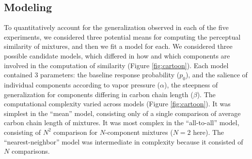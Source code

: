 \subsection*{Modeling}
\label{sec:results_modeling}
To quantitatively account for the generalization observed in each of the five experiments, we considered three potential means for computing the perceptual similarity of mixtures, and then we fit a model for each.  
We considered three possible candidate models, which differed in how and which components are involved in the computation of similarity (Figure \ref{fig:cartoon}).  
Each model contained 3 parameters: the baseline response probability ($p_0$), and the salience of individual components according to vapor pressure ($\alpha$), the steepness of generalization for components differing in carbon chain length ($\beta$).  
The computational complexity varied across models (Figure \ref{fig:cartoon}).  It was simplest in the ``mean'' model, consisting only of a single comparison of average carbon chain length of mixtures.  
It was most complex in the ``all-to-all'' model, consisting of $N^2$ comparison for $N$-component mixtures ($N=2$ here).  The ``nearest-neighbor'' model was intermediate in complexity because it consisted of $N$ comparisons.  